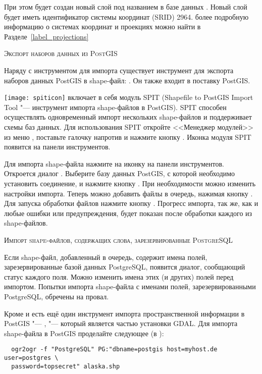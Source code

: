 При этом будет создан новый слой под названием  в
базе данных . Новый слой будет иметь идентификатор
системы координат (SRID) 2964. более подробную информацию о системах координат
и проекциях можно найти в Разделе~\ref{label_projections}
\begin{Tip}
\caption{\textsc{Экспорт наборов данных из PostGIS}}
Наряду с инструментом для импорта  существует инструмент
для экспорта наборов данных PostGIS в shape-файл: .
Он также входит в поставку PostGIS.
\end{Tip}

\texttt{[image: spiticon]} \qg включает в себя модуль
SPIT (Shapefile to PostGIS Import Tool "--- инструмент импорта shape-файлов
в PostGIS). SPIT способен осуществлять одновременный
импорт нескольких shape-файлов и поддерживает схемы баз данных. Для
использования SPIT откройте <<Менеджер модулей>> \qg из меню
, поставьте галочку напротив  и нажмите
кнопку . Иконка модуля SPIT появится на панели инструментов.

Для импорта shape-файла нажмите на иконку 
на панели инструментов. \\
Откроется диалог .
Выберите базу данных PostGIS, с которой необходимо установить соединение, и
нажмите кнопку . При необходимости можно изменить
настройки импорта. Теперь можно добавить файлы в очередь, нажимая кнопку
. Для запуска обработки файлов нажмите кнопку .
Прогресс импорта, так же, как и любые ошибки или предупреждения, будет
показан после обработки каждого из shape-файлов.

\begin{Tip}\caption{\textsc{Импорт shape-файлов, содержащих
слова, зарезервированные PostgreSQL}}
Если shape-файл, добавленный в очередь, содержит имена полей, зарезервированные
базой данных PostgreSQL, появится диалог, сообщающий статус каждого поля.
Можно изменить имена этих (и других) полей
перед импортом. Попытки импорта shape-файла с именами полей, зарезервированными
PostgreSQL, обречены на провал.
\end{Tip}

Кроме  и  есть ещё один инструмент
импорта пространственной информации в PostGIS "--- , "---
который является частью установки GDAL. Для импорта shape-файла в PostGIS
проделайте следующее (в \nix):
\begin{verbatim}
  ogr2ogr -f "PostgreSQL" PG:"dbname=postgis host=myhost.de user=postgres \
  password=topsecret" alaska.shp
\end{verbatim}

